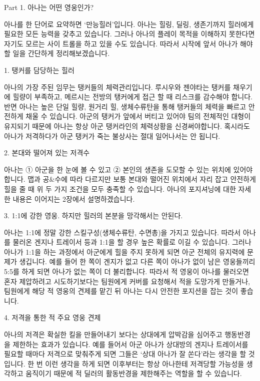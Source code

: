 Part 1. 아나는 어떤 영웅인가?

 

아나를 한 단어로 요약하면 ‘만능힐러’입니다. 아나는 힐링, 딜링, 생존기까지 힐러에게 필요한 모든 능력을 갖추고 있습니다. 그러나 아나의 플레이 목적을 이해하지 못한다면 자기도 모르는 사이 트롤을 하고 있을 수도 있습니다. 따라서 시작에 앞서 아나가 해야 할 일을 간단하게 정리해보겠습니다.

 

1. 탱커를 담당하는 힐러

 

아나의 가장 주된 임무는 탱커들의 체력관리입니다. 루시우와 젠야타는 탱커를 채우기에 힐량이 부족하고, 메르시는 전방의 탱커에게 접근 할 때 리스크를 감수해야 합니다. 반면 아나는 높은 단일 힐량, 원거리 힐, 생체수류탄을 통해 탱커들의 체력을 빠르고 안전하게 채울 수 있습니다. 아군의 탱커가 앞에서 버티고 있어야 팀의 전체적인 대형이 유지되기 때문에 아나는 항상 아군 탱커라인의 체력상황을 신경써야합니다. 혹시라도 아나가 저격하다가 아군 탱커가 죽는 불상사는 절대 일어나서는 안 됩니다.



2. 본대와 떨어져 있는 저격수

 

아나는 ① 아군을 한 눈에 볼 수 있고 ② 본인의 생존을 도모할 수 있는 위치에 있어야 합니다. 맵과 공&수에 따라 다르지만 보통 본대와 떨어진 위치에서 자리 잡고 안전하게 힐을 줄 때 위 두 가지 조건을 모두 충족할 수 있습니다. 아나의 포지셔닝에 대한 자세한 내용은 이어지는 2장에서 설명하겠습니다.

 

3. 1:1에 강한 영웅. 하지만 힐러의 본분을 망각해서는 안된다.

 

아나는 1:1에 정말 강한 스킬구성(생체수류탄, 수면총)을 가지고 있습니다. 따라서 아나를 물러온 겐지나 트레이서 등과 1:1을 할 경우 높은 확률로 이길 수 있습니다. 그러나 아나가 1:1을 하는 과정에서 아군에게 힐을 주지 못하게 되면 아군 전체의 유지력에 문제가 생깁니다. 예를 들어 한 쪽이 겐지가 없고 다른 쪽이 아나가 없이 남은 영웅들끼리 5:5를 하게 되면 아나가 없는 쪽이 더 불리합니다. 따라서 적 영웅이 아나를 물러오면 혼자 제압하려고 시도하기보다는 팀원에게 커버를 요청해서 적을 도망가게 만들거나, 팀원에게 해당 적 영웅의 견제를 맡긴 뒤 아나는 다시 안전한 포지션을 잡는 것이 좋습니다.

 

4. 저격을 통한 적 주요 영웅 견제

 

아나의 저격은 확실한 킬을 만들어내기 보다는 상대에게 압박감을 심어주고 행동반경을 제한하는 효과가 있습니다. 예를 들어서 아군 아나가 상대방의 겐지나 트레이서를 필요할 때마다 저격으로 맞춰주게 되면 그들은 ‘상대 아나가 잘 쏜다’라는 생각을 할 것입니다. 한 번 이런 생각을 하게 되면 이후부터는 항상 아나한테 저격당할 가능성을 생각하고 움직이기 때문에 적 딜러의 활동반경을 제한해주는 역할을 할 수 있습니다.

